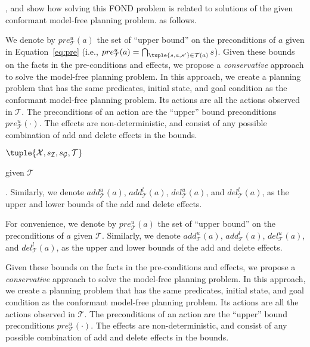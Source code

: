 , 
and show how solving this FOND problem is related to solutions of the given conformant model-free planning problem.  
as follows. 



We denote by $pre_\mathcal{T}^u(a)$ the set of ``upper bound'' on the preconditions of $a$ 
given in Equation~\ref{eq:pre} (i.e., $pre_\mathcal{T}^u(a)=\bigcap_{\tuple{s, a, s'}\in \mathcal{T}(a)} s$). 
Given these bounds on the facts in the pre-conditions and effects, we propose a {\em conservative} approach to solve the model-free planning problem. In this approach, we create a planning problem that has the same predicates, initial state, and goal condition as the conformant model-free planning problem. Its actions are all the actions observed in $\mathcal{T}$. The preconditions of an action are the ``upper'' bound preconditions $pre_\mathcal{T}^u(\cdot)$. The effects are non-deterministic, and consist of any possible combination of add and delete effects in the bounds. 

$\tuple{\mathcal{X},s_\mathcal{I}, s_\mathcal{G}, \mathcal{T}}$

given $\mathcal{T}$ 




. Similarly, we denote $add_\mathcal{T}^u(a)$, $add_\mathcal{T}^l(a)$, $del_\mathcal{T}^u(a)$, and $del_\mathcal{T}^l(a)$, as the upper and lower bounds of the add and delete effects. 



For convenience, we denote by $pre_\mathcal{T}^u(a)$ the set of ``upper bound'' on the preconditions of $a$ given $\mathcal{T}$. Similarly, we denote $add_\mathcal{T}^u(a)$, $add_\mathcal{T}^l(a)$, $del_\mathcal{T}^u(a)$, and $del_\mathcal{T}^l(a)$, as the upper and lower bounds of the add and delete effects. 


Given these bounds on the facts in the pre-conditions and effects, we propose a {\em conservative} approach to solve the model-free planning problem. In this approach, we create a planning problem that has the same predicates, initial state, and goal condition as the conformant model-free planning problem. Its actions are all the actions observed in $\mathcal{T}$. The preconditions of an action are the ``upper'' bound preconditions $pre_\mathcal{T}^u(\cdot)$. The effects are non-deterministic, and consist of any possible combination of add and delete effects in the bounds. 

